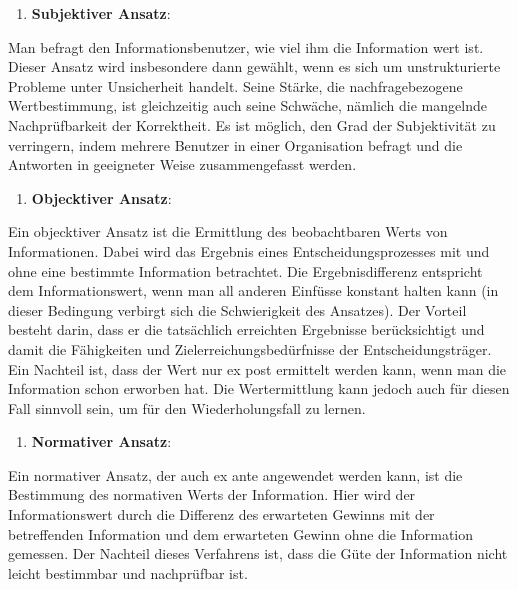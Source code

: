 \documentclass[]{article}
\providecommand{\tightlist}{%
  \setlength{\itemsep}{0pt}\setlength{\parskip}{0pt}}
\begin{document}
\begin{enumerate}
\def\labelenumi{\arabic{enumi}.}
\tightlist
\item
  \textbf{Subjektiver Ansatz}:
\end{enumerate}

Man befragt den Informationsbenutzer, wie viel ihm die Information wert
ist. Dieser Ansatz wird insbesondere dann gewählt, wenn es sich um
unstrukturierte Probleme unter Unsicherheit handelt. Seine Stärke, die
nachfragebezogene Wertbestimmung, ist gleichzeitig auch seine Schwäche,
nämlich die mangelnde Nachprüfbarkeit der Korrektheit. Es ist möglich,
den Grad der Subjektivität zu verringern, indem mehrere Benutzer in
einer Organisation befragt und die Antworten in geeigneter Weise
zusammengefasst werden.

\begin{enumerate}
\def\labelenumi{\arabic{enumi}.}
\setcounter{enumi}{1}
\tightlist
\item
  \textbf{Objecktiver Ansatz}:
\end{enumerate}

Ein objecktiver Ansatz ist die Ermittlung des beobachtbaren Werts von
Informationen. Dabei wird das Ergebnis eines Entscheidungsprozesses mit
und ohne eine bestimmte Information betrachtet. Die Ergebnisdifferenz
entspricht dem Informationswert, wenn man all anderen Einfüsse konstant
halten kann (in dieser Bedingung verbirgt sich die Schwierigkeit des
Ansatzes). Der Vorteil besteht darin, dass er die tatsächlich erreichten
Ergebnisse berücksichtigt und damit die Fähigkeiten und
Zielerreichungsbedürfnisse der Entscheidungsträger. Ein Nachteil ist,
dass der Wert nur ex post ermittelt werden kann, wenn man die
Information schon erworben hat. Die Wertermittlung kann jedoch auch für
diesen Fall sinnvoll sein, um für den Wiederholungsfall zu lernen.

\begin{enumerate}
\def\labelenumi{\arabic{enumi}.}
\setcounter{enumi}{2}
\tightlist
\item
  \textbf{Normativer Ansatz}:
\end{enumerate}

Ein normativer Ansatz, der auch ex ante angewendet werden kann, ist die
Bestimmung des normativen Werts der Information. Hier wird der
Informationswert durch die Differenz des erwarteten Gewinns mit der
betreffenden Information und dem erwarteten Gewinn ohne die Information
gemessen. Der Nachteil dieses Verfahrens ist, dass die Güte der
Information nicht leicht bestimmbar und nachprüfbar ist.
\end{document}
